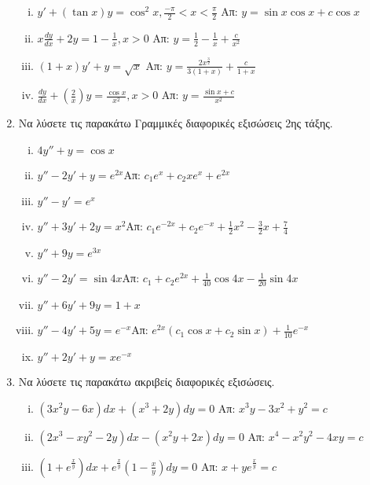 \documentclass[a4paper,12pt]{article}
\begin{document}
\begin{enumerate}
\begin{enumerate}[i)]
\item $y'+(\tan x)y = \cos^2 x, \frac{-\pi}{2}<x<\frac{\pi}{2}$ \hfill Απ: $y=\sin x \cos x+c\cos x$

\item $x\frac{dy}{dx}+2y=1-\frac{1}{x}, x>0$ \hfill Απ: $y=\frac{1}{2}-\frac{1}{x}+\frac{c}{x^2}$

\item $(1+x)y'+y=\sqrt{x}$ \hfill Απ: $y=\frac{2x^{\frac{3}{2}}}{3(1+x)}+\frac{c}{1+x}$ 

\item $\frac{dy}{dx}+(\frac{2}{x})y=\frac{\cos x}{x^2}, x>0$ \hfill Απ: $y=\frac{\sin x+c}{x^2}$


\end{enumerate}

\item Να λύσετε τις παρακάτω Γραμμικές διαφορικές εξισώσεις 2ης τάξης.

\begin{enumerate}[i)]

\item $4y''+y=\cos x$ 
\item $y''-2y'+y=e^{2x}$\hfill Απ: $c_1e^x+c_2xe^x+e^{2x}$
\item $y''-y'=e^x$
\item $y''+3y'+2y=x^2$\hfill Απ: $c_1e^{-2x}+c_2e^{-x}+\frac{1}{2}x^2-\frac{3}{2}x+\frac{7}{4}$
\item $y''+9y=e^{3x}$
\item $y''-2y'=\sin 4x$\hfill Απ: $c_1+c_2e^{2x}+\frac{1}{40}\cos 4x-\frac{1}{20}\sin 4x$
\item $y''+6y'+9y=1+x$
\item $y''-4y'+5y=e^{-x}$\hfill Απ: $e^{2x}(c_1\cos x+c_2\sin x)+\frac{1}{10}e^{-x}$
\item $y''+2y'+y=xe^{-x}$
\end{enumerate}

\item Να λύσετε τις παρακάτω ακριβείς διαφορικές εξισώσεις.

\begin{enumerate}[i)]

\item $(3x^2y -6x)dx +(x^3+2y)dy=0$ \hfill Απ: $x^3y-3x^2+y^2=c$

\item $(2x^3-xy^2-2y)dx - (x^2y+2x)dy=0$ \hfill Απ: $x^4-x^2y^2-4xy=c$

\item $(1+e^{\frac{x}{y}})dx+e^{\frac{x}{y}}(1-\frac{x}{y})dy = 0$ \hfill Απ: $x+ye^{\frac{x}{y}}=c$


\end{enumerate}
\end{enumerate}
\end{document}
